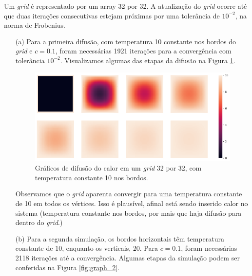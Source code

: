 \documentclass{article}
\begin{document}
        Um \textit{grid} é representado por um array 32 por 32. A atualização do \textit{grid} ocorre até que 
        duas iterações consecutivas estejam próximas por uma tolerância de $10^{-2}$, na norma de Frobenius.

        \begin{itemize}
            \item[(a)] Para a primeira difusão, com temperatura 10 constante nos bordos do \textit{grid}
                e $c=0.1$, foram necessárias 1921 iterações para a convergência com tolerância $10^{-2}$. Visualizamos algumas das etapas da difusão na Figura \ref{fig:graph_1}.
                
                \begin{figure}[!h]
                    \includegraphics[width=\textwidth]{graph_1.png}
                    \caption{Gráficos de difusão do calor em um \textit{grid} 32 por 32, com temperatura constante 10 nos bordos.}
                    \label{fig:graph_1}
                \end{figure}

                Observamos que o \textit{grid} aparenta convergir para uma temperatura constante de 10 em todos os vértices.
                Isso é plausível, afinal está sendo inserido calor no sistema (temperatura constante nos bordos, por mais que haja difusão
                para dentro do \textit{grid}.)

            \item[(b)] Para a segunda simulação, os bordos horizontais têm temperatura constante de 10,
                enquanto os verticais, 20. Para $c=0.1$, foram necessárias 2118 iterações até a convergência. Algumas etapas da simulação
                podem ser conferidas na Figura \ref{fig:graph_2}.
                

\end{itemize}
\end{document}
